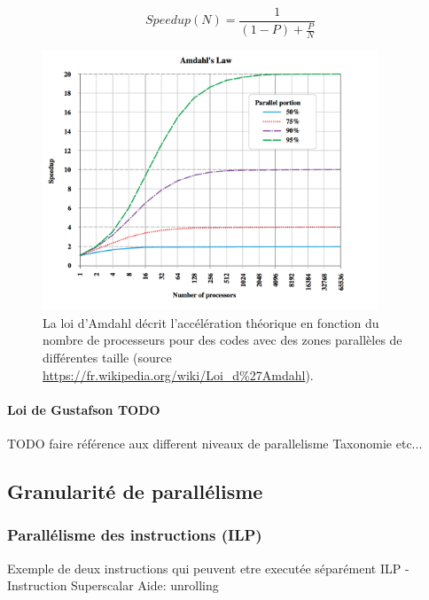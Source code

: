 \begin{equation}
\label{eq_amdahl}
    Speedup (N) = \frac{1}{(1-P) + \frac{P}{N}}
\end{equation}

\begin{figure}
    \center
    \includegraphics[width=10cm]{images/Chapitre1/AmdahlsLaw.png}
    \caption{\label{pic_amdahl} La loi d'Amdahl décrit l'accélération théorique en fonction du nombre de processeurs pour des codes avec des zones parallèles de différentes taille (source \url{https://fr.wikipedia.org/wiki/Loi\_d\%27Amdahl}).}
\end{figure}

\paragraph{Loi de Gustafson TODO}

TODO faire référence aux different niveaux de parallelisme Taxonomie etc...










\subsection{Granularité de parallélisme}

\subsubsection{Parallélisme des instructions (ILP)}
Exemple de deux instructions qui peuvent etre executée séparément
ILP - Instruction
	Superscalar
	Aide: unrolling
	
